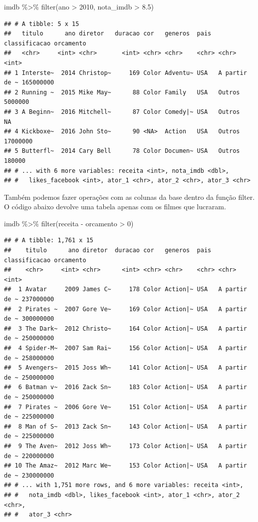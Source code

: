 \documentclass[
]{book}
\newenvironment{Shaded}{\begin{snugshade}}{\end{snugshade}}
\newcommand{\DecValTok}[1]{\textcolor[rgb]{0.00,0.00,0.81}{#1}}
\newcommand{\FloatTok}[1]{\textcolor[rgb]{0.00,0.00,0.81}{#1}}
\newcommand{\FunctionTok}[1]{\textcolor[rgb]{0.00,0.00,0.00}{#1}}
\newcommand{\NormalTok}[1]{#1}
\newcommand{\SpecialCharTok}[1]{\textcolor[rgb]{0.00,0.00,0.00}{#1}}
\begin{document}
\begin{Shaded}
\begin{Highlighting}[]
\NormalTok{imdb }\SpecialCharTok{\%\textgreater{}\%} \FunctionTok{filter}\NormalTok{(ano }\SpecialCharTok{\textgreater{}} \DecValTok{2010}\NormalTok{, nota\_imdb }\SpecialCharTok{\textgreater{}} \FloatTok{8.5}\NormalTok{)}
\end{Highlighting}
\end{Shaded}

\begin{verbatim}
## # A tibble: 5 x 15
##   titulo      ano diretor   duracao cor   generos  pais  classificacao orcamento
##   <chr>     <int> <chr>       <int> <chr> <chr>    <chr> <chr>             <int>
## 1 Interste~  2014 Christop~     169 Color Adventu~ USA   A partir de ~ 165000000
## 2 Running ~  2015 Mike May~      88 Color Family   USA   Outros          5000000
## 3 A Beginn~  2016 Mitchell~      87 Color Comedy|~ USA   Outros               NA
## 4 Kickboxe~  2016 John Sto~      90 <NA>  Action   USA   Outros         17000000
## 5 Butterfl~  2014 Cary Bell      78 Color Documen~ USA   Outros           180000
## # ... with 6 more variables: receita <int>, nota_imdb <dbl>,
## #   likes_facebook <int>, ator_1 <chr>, ator_2 <chr>, ator_3 <chr>
\end{verbatim}

Também podemos fazer operações com as colunas da base dentro da função filter. O código abaixo devolve uma tabela apenas com os filmes que lucraram.

\begin{Shaded}
\begin{Highlighting}[]
\NormalTok{imdb }\SpecialCharTok{\%\textgreater{}\%} \FunctionTok{filter}\NormalTok{(receita }\SpecialCharTok{{-}}\NormalTok{ orcamento }\SpecialCharTok{\textgreater{}} \DecValTok{0}\NormalTok{)}
\end{Highlighting}
\end{Shaded}

\begin{verbatim}
## # A tibble: 1,761 x 15
##    titulo      ano diretor  duracao cor   generos  pais  classificacao orcamento
##    <chr>     <int> <chr>      <int> <chr> <chr>    <chr> <chr>             <int>
##  1 Avatar     2009 James C~     178 Color Action|~ USA   A partir de ~ 237000000
##  2 Pirates ~  2007 Gore Ve~     169 Color Action|~ USA   A partir de ~ 300000000
##  3 The Dark~  2012 Christo~     164 Color Action|~ USA   A partir de ~ 250000000
##  4 Spider-M~  2007 Sam Rai~     156 Color Action|~ USA   A partir de ~ 258000000
##  5 Avengers~  2015 Joss Wh~     141 Color Action|~ USA   A partir de ~ 250000000
##  6 Batman v~  2016 Zack Sn~     183 Color Action|~ USA   A partir de ~ 250000000
##  7 Pirates ~  2006 Gore Ve~     151 Color Action|~ USA   A partir de ~ 225000000
##  8 Man of S~  2013 Zack Sn~     143 Color Action|~ USA   A partir de ~ 225000000
##  9 The Aven~  2012 Joss Wh~     173 Color Action|~ USA   A partir de ~ 220000000
## 10 The Amaz~  2012 Marc We~     153 Color Action|~ USA   A partir de ~ 230000000
## # ... with 1,751 more rows, and 6 more variables: receita <int>,
## #   nota_imdb <dbl>, likes_facebook <int>, ator_1 <chr>, ator_2 <chr>,
## #   ator_3 <chr>
\end{verbatim}
\end{document}

